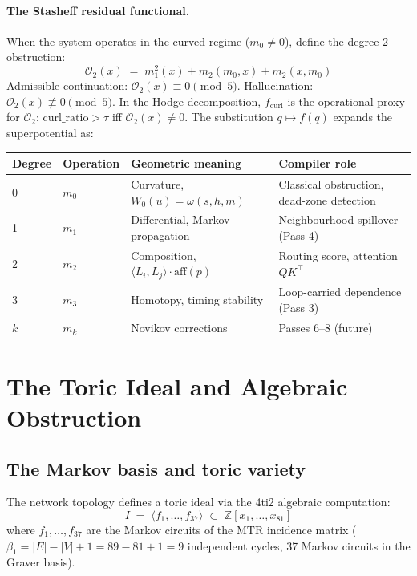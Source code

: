 \documentclass[11pt,a4paper]{article}
\begin{document}
\paragraph{The Stasheff residual functional.}
When the system operates in the curved regime ($m_0 \neq 0$),
define the degree-2 obstruction:
\[
  \mathcal{O}_2(x) \;=\; m_1^2(x) + m_2(m_0,x) + m_2(x,m_0)
\]
Admissible continuation: $\mathcal{O}_2(x) \equiv 0 \pmod{5}$.
Hallucination: $\mathcal{O}_2(x) \not\equiv 0 \pmod{5}$.
In the Hodge decomposition, $f_\mathrm{curl}$ is the operational
proxy for $\mathcal{O}_2$: $\mathrm{curl\_ratio} > \tau$
iff $\mathcal{O}_2(x) \neq 0$.
The substitution $q \mapsto f(q)$ expands the superpotential as:

\begin{center}
\renewcommand{\arraystretch}{1.3}\small
\begin{tabularx}{\linewidth}{p{1.2cm}p{1.8cm}p{4.5cm}X}
\toprule
Degree & Operation & Geometric meaning & Compiler role \\
\midrule
0 & $m_0$ & Curvature, $W_0(u) = \omega(s,h,m)$ &
  Classical obstruction, dead-zone detection \\
1 & $m_1$ & Differential, Markov propagation &
  Neighbourhood spillover (Pass 4) \\
2 & $m_2$ & Composition, $\langle L_i,L_j\rangle\cdot\mathrm{aff}(p)$ &
  Routing score, attention $QK^\top$ \\
3 & $m_3$ & Homotopy, timing stability &
  Loop-carried dependence (Pass 3) \\
$k$ & $m_k$ & Novikov corrections &
  Passes 6--8 (future) \\
\bottomrule
\end{tabularx}
\end{center}

\section{The Toric Ideal and Algebraic Obstruction}

\subsection{The Markov basis and toric variety}

The network topology defines a toric ideal via the 4ti2
algebraic computation:
\[
  I \;=\; \langle f_1, \ldots, f_{37} \rangle \;\subset\;
  \mathbb{Z}[x_1,\ldots,x_{81}]
\]
where $f_1,\ldots,f_{37}$ are the Markov circuits of the
MTR incidence matrix ($\beta_1 = |E| - |V| + 1 = 89-81+1 = 9$
independent cycles, 37 Markov circuits in the Graver basis).
\end{document}
